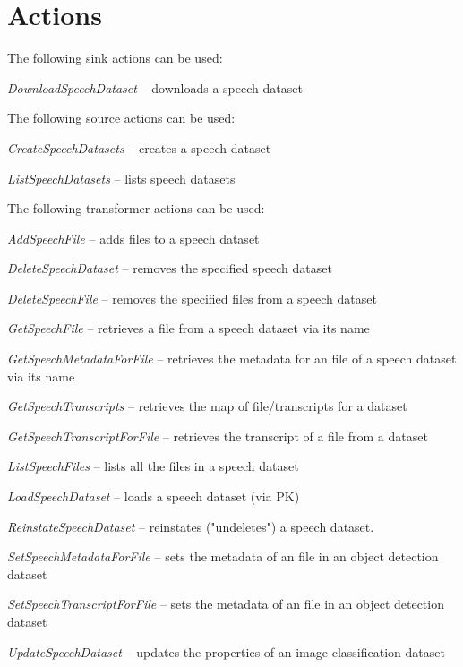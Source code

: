 \documentclass[a4paper]{book}
\begin{document}
\section{Actions}
The following sink actions can be used:
\begin{tight_itemize}
  \item \textit{DownloadSpeechDataset} -- downloads a speech dataset
\end{tight_itemize}
The following source actions can be used:
\begin{tight_itemize}
  \item \textit{CreateSpeechDatasets} -- creates a speech dataset
  \item \textit{ListSpeechDatasets} -- lists speech datasets
\end{tight_itemize}
The following transformer actions can be used:
\begin{tight_itemize}
  \item \textit{AddSpeechFile} -- adds files to a speech dataset
  \item \textit{DeleteSpeechDataset} -- removes the specified speech dataset
  \item \textit{DeleteSpeechFile} -- removes the specified files from a speech dataset
  \item \textit{GetSpeechFile} -- retrieves a file from a speech dataset via its name
  \item \textit{GetSpeechMetadataForFile} -- retrieves the metadata for an file of a speech dataset via its name
  \item \textit{GetSpeechTranscripts} -- retrieves the map of file/transcripts for a dataset
  \item \textit{GetSpeechTranscriptForFile} -- retrieves the transcript of a file from a dataset
  \item \textit{ListSpeechFiles} -- lists all the files in a speech dataset
  \item \textit{LoadSpeechDataset} -- loads a speech dataset (via PK)
  \item \textit{ReinstateSpeechDataset} -- reinstates ("undeletes") a speech dataset.
  \item \textit{SetSpeechMetadataForFile} -- sets the metadata of an file in an object detection dataset
  \item \textit{SetSpeechTranscriptForFile} -- sets the metadata of an file in an object detection dataset
  \item \textit{UpdateSpeechDataset} -- updates the properties of an image classification dataset
\end{tight_itemize}
\end{document}
